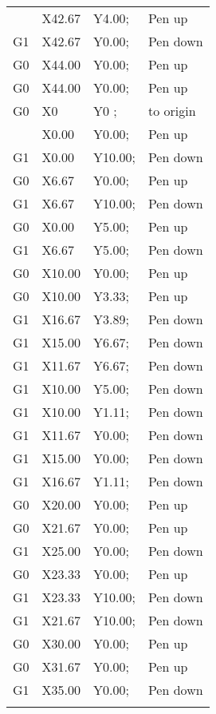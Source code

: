 \begin{longtable}{|>{\raggedright\arraybackslash}m{}|>{\raggedright\arraybackslash}m{}|>{\raggedright\arraybackslash}m{}|>{\raggedright\arraybackslash}m{}|}
\begin{array}{cccl}
    G0 &X42.67 &Y4.00; &Pen up\\
    G1 &X42.67 &Y0.00; &Pen down\\
    G0 &X44.00 &Y0.00; &Pen up\\
    G0 &X44.00 &Y0.00; &Pen up\\
    G0 &X0 &Y0 ;& to origin\\
    \end{array}$\\ \hline
    main & test normal case with carrage return & SingleStrokeFont, test.txt: "Hello $\backslash$n World", 10mm text height & \scriptsize$\begin{array}{cccl}
        G0 &X0.00  &Y0.00;   &Pen up\\
        G1 &X0.00  &Y10.00;  &Pen down\\
        G0 &X6.67  &Y0.00;   &Pen up\\
        G1 &X6.67  &Y10.00;  &Pen down\\
        G0 &X0.00  &Y5.00;   &Pen up\\
        G1 &X6.67  &Y5.00;   &Pen down\\
        G0 &X10.00 &Y0.00;   &Pen up\\
        G0 &X10.00 &Y3.33;   &Pen up\\
        G1 &X16.67 &Y3.89;   &Pen down\\
        G1 &X15.00 &Y6.67;   &Pen down\\
        G1 &X11.67 &Y6.67;   &Pen down\\
        G1 &X10.00 &Y5.00;   &Pen down\\
        G1 &X10.00 &Y1.11;   &Pen down\\
        G1 &X11.67 &Y0.00;   &Pen down\\
        G1 &X15.00 &Y0.00;   &Pen down\\
        G1 &X16.67 &Y1.11;   &Pen down\\
        G0 &X20.00 &Y0.00;   &Pen up\\
        G0 &X21.67 &Y0.00;   &Pen up\\
        G1 &X25.00 &Y0.00;   &Pen down\\
        G0 &X23.33 &Y0.00;   &Pen up\\
        G1 &X23.33 &Y10.00;  &Pen down\\
        G1 &X21.67 &Y10.00;  &Pen down\\
        G0 &X30.00 &Y0.00;   &Pen up\\
        G0 &X31.67 &Y0.00;   &Pen up\\
        G1 &X35.00 &Y0.00;   &Pen down\\

\end{array}
\end{longtable}
